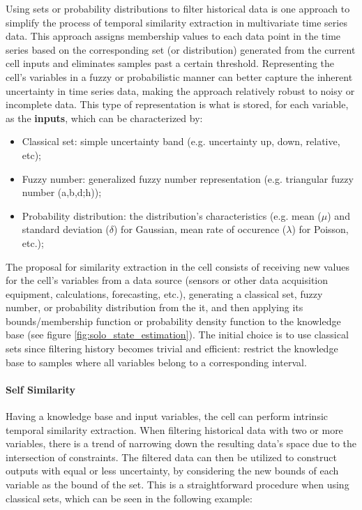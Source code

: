 Using sets or probability distributions to filter historical data is one approach to simplify the process of temporal similarity extraction in multivariate time series data. This approach assigns membership values to each data point in the time series based on the corresponding set (or distribution) generated from the current cell inputs and eliminates samples past a certain threshold. Representing the cell's variables in a fuzzy or probabilistic manner can better capture the inherent uncertainty in time series data, making the approach relatively robust to noisy or incomplete data. This type of representation is what is stored, for each variable, as the \textbf{inputs}, which can be characterized by:

\begin{itemize}
    \item Classical set: simple uncertainty band (e.g. uncertainty up, down, relative, etc);
    \item Fuzzy number: generalized fuzzy number representation \cite{Zhang2019} (e.g. triangular fuzzy number (a,b,d;h));
    \item Probability distribution: the distribution's characteristics (e.g. mean ($\mu$) and standard deviation ($\delta$) for Gaussian, mean rate of occurence ($\lambda$) for Poisson, etc.);
\end{itemize}

The proposal for similarity extraction in the cell consists of receiving new values for the cell's variables from a data source (sensors or other data acquisition equipment, calculations, forecasting, etc.), generating a classical set, fuzzy number, or probability distribution from the it, and then applying its bounds/membership function or probability density function to the knowledge base (see figure \ref{fig:solo_state_estimation}). The initial choice is to use classical sets since filtering history becomes trivial and efficient: restrict the knowledge base to samples where all variables belong to a corresponding interval.

\paragraph{Self Similarity}

Having a knowledge base and input variables, the cell can perform intrinsic temporal similarity extraction. When filtering historical data with two or more variables, there is a trend of narrowing down the resulting data's space due to the intersection of constraints. The filtered data can then be utilized to construct outputs with equal or less uncertainty, by considering the new bounds of each variable as the bound of the set. This is a straightforward procedure when using classical sets, which can be seen in the following example:

